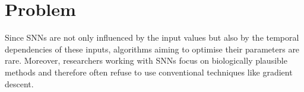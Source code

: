 \section{Problem}
\label{subsec:problem}

Since \acp{SNN} are not only influenced by the input values but also by the temporal dependencies of these inputs, 
algorithms aiming to optimise their parameters are rare.
Moreover, researchers working with \acp{SNN} focus on biologically plausible methods and 
therefore often refuse to use conventional techniques like gradient descent.